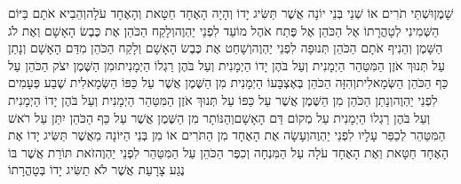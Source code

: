 \documentclass[../main/main.tex]{subfiles}
\begin{document}
\begin{multicols*}{\ncols}
שָׁמֶן\PreVerseSpace{}וּשְׁתֵּי תֹרִים אוֹ שְׁנֵי בְּנֵי יוֹנָה אֲשֶׁר תַּשִּׂיג יָדוֹ וְהָיָה הָאֶחָד\SubEnd{} חַטָּאת וְהָאֶחָד עֹלָה\PreVerseSpace{}וְהֵבִיא אֹתָם בַּיּוֹם הַשְּׁמִינִי לְטָהֳרָתוֹ אֶל הַכֹּהֵן אֶל פֶּתַח אֹהֶל מוֹעֵד לִפְנֵי יַהְוֶה\PreVerseSpace{}וְלָקַח הַכֹּהֵן אֶת כֶּבֶשׂ הָאָשָׁם וְאֶת לֹג הַשָּׁמֶן וְהֵנִיף אֹתָם הַכֹּהֵן תְּנוּפָה לִפְנֵי יַהְוֶה\PreVerseSpace{}וְשָׁחַט אֶת כֶּבֶשׂ הָאָשָׁם וְלָקַח הַכֹּהֵן מִדַּם הָאָשָׁם וְנָתַן עַל תְּנוּךְ אֹזֶן הַמִּטַּהֵר הַיְמָנִית וְעַל בֹּהֶן יָדוֹ הַיְמָנִית וְעַל בֹּהֶן רַגְלוֹ הַיְמָנִית\PreVerseSpace{}וּמִן הַשֶּׁמֶן יִצֹק הַכֹּהֵן עַל כַּף הַכֹּהֵן הַשְּׂמָאלִית\PreVerseSpace{}וְהִזָּה הַכֹּהֵן בְּאֶצְבָּעוֹ הַיְמָנִית מִן הַשֶּׁמֶן אֲשֶׁר עַל כַּפּוֹ הַשְּׂמָאלִית שֶׁבַע פְּעָמִים לִפְנֵי יַהְוֶה\PreVerseSpace{}וְנָתַן הַכֹּהֵן מִן הַשֶּׁמֶן אֲשֶׁר עַל כַּפּוֹ עַל תְּנוּךְ אֹזֶן הַמִּטַּהֵר הַיְמָנִית וְעַל בֹּהֶן יָדוֹ הַיְמָנִית וְעַל בֹּהֶן רַגְלוֹ הַיְמָנִית עַל מְקוֹם דַּם הָאָשָׁם\PreVerseSpace{}וְהַנּוֹתָר מִן הַשֶּׁמֶן אֲשֶׁר עַל כַּף הַכֹּהֵן יִתֵּן עַל רֹאשׁ הַמִּטַּהֵר לְכַפֵּר עָלָיו לִפְנֵי יַהְוֶה\PreVerseSpace{}וְעָשָׂה אֶת הָאֶחָד מִן הַתֹּרִים אוֹ מִן בְּנֵי הַיּוֹנָה מֵאֲשֶׁר תַּשִּׂיג יָדוֹ\PreVerseSpace{} אֶת הָאֶחָד חַטָּאת וְאֶת הָאֶחָד עֹלָה עַל הַמִּנְחָה וְכִפֶּר הַכֹּהֵן עַל הַמִּטַּהֵר לִפְנֵי יַהְוֶה\PreVerseSpace{}זֹאת תּוֹרַת אֲשֶׁר בּוֹ נֶגַע צָרָעַת אֲשֶׁר לֹא תַשִּׂיג יָדוֹ בְּטָהֳרָתוֹ\OpenSection{}\par

\end{multicols*}
\end{document}
